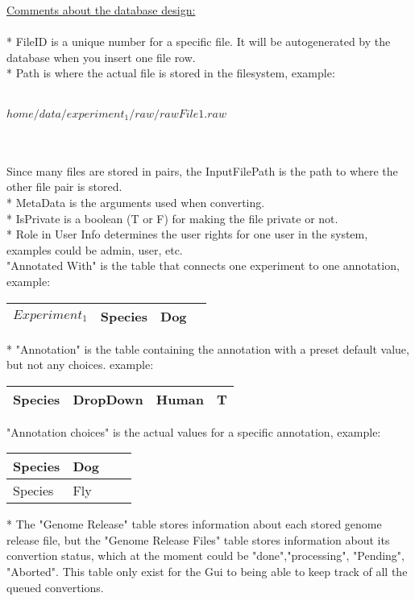 \documentclass[a4paper]{report}
\begin{document}
\underline{Comments about the database design:}\\
\\
* FileID is a unique number for a specific file. It will be autogenerated by the database when you insert one file row.\\
* Path is where the actual file is stored in the filesystem, example:\\
\\
\centerline{$home/data/experiment_1/raw/rawFile1.raw$}\\
\\
Since many files are stored in pairs, the InputFilePath is the path to where the other file pair  is stored.\\
* MetaData is the arguments used when converting. \\
* IsPrivate is a boolean (T or F) for making the file private or not.\\
* Role in User Info determines the user rights for one user in the system, examples could be admin, user, etc.\\
"Annotated With" is the table that connects one experiment to one annotation, example:
\begin{center}
  \begin{tabular}{| l | l | l | l|}
    \hline
    $Experiment_1$ & Species & Dog\\ \hline
  \end{tabular}
\end{center}
* "Annotation" is the table containing the annotation with a preset default value, but not any choices. example:
\begin{center}
  \begin{tabular}{| l | l | l | l|}
    \hline
    Species & DropDown & Human & T \\ \hline
  \end{tabular}
\end{center}
"Annotation choices" is the actual values for a specific annotation, example:\\
\begin{center}
  \begin{tabular}{| l | l | l | l|}
    \hline
    Species & Dog \\ \hline
    Species & Fly \\ \hline
  \end{tabular}
\end{center}
* The "Genome Release" table stores information about each stored genome release file, but the "Genome Release Files" table stores information about its convertion status, which at the moment could be "done","processing", "Pending", "Aborted". This table only exist for the Gui to being able to keep track of all the queued convertions.\\
\end{document}
